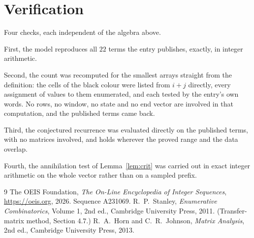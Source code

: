 \documentclass[11pt,a4paper]{article}
\theoremstyle{plain}
\theoremstyle{definition}
\begin{document}
\section{Verification}

Four checks, each independent of the algebra above.

First, the model reproduces all $22$ terms the entry publishes, exactly, in integer
arithmetic.

Second, the count was recomputed for the smallest arrays straight from the definition: the cells
of the black colour were listed from $i+j$ directly, every assignment of values to them
enumerated, and each tested by the entry's own words. No rows, no window, no state and no end
vector are involved in that computation, and the published terms came back.

Third, the conjectured recurrence was evaluated directly on the published terms, with no
matrices involved, and holds wherever the proved range and the data overlap.

Fourth, the annihilation test of Lemma~\ref{lem:crit} was carried out in exact integer
arithmetic on the whole vector rather than on a sampled prefix.

\begin{thebibliography}{9}
 The OEIS Foundation, \emph{The On-Line Encyclopedia of Integer
Sequences}, \url{https://oeis.org}, 2026. Sequence A231069.
 R.~P.~Stanley, \emph{Enumerative Combinatorics}, Volume 1, 2nd ed.,
Cambridge University Press, 2011. (Transfer-matrix method, Section 4.7.)
 R.~A.~Horn and C.~R.~Johnson, \emph{Matrix Analysis}, 2nd ed., Cambridge
University Press, 2013.
\end{thebibliography}
\end{document}
